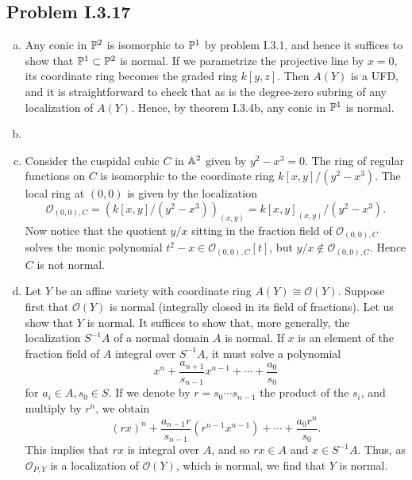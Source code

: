 \documentclass{mathnotes}
\begin{document}
\subsection*{Problem I.3.17}
\begin{enumerate}[(a)]
    \item Any conic in $\mathbb{P}^2$ is isomorphic to $\mathbb{P}^1$ by problem I.3.1, and hence it
        suffices to show that $\mathbb{P}^1\subset\mathbb{P}^2$ is normal. If we parametrize the
        projective line by $x=0$, its coordinate ring becomes the graded ring $k[y,z]$.
        Then $A(Y)$ is a UFD, and it is straightforward to check that as is the degree-zero
        subring of any localization of $A(Y)$. Hence, by theorem I.3.4b, any conic
        in $\mathbb{P}^1$ is normal.
    \item 
    \item Consider the cuspidal cubic $C$ in $\mathbb{A}^2$ given by $y^2-x^3=0$. The ring of regular
        functions on $C$ is isomorphic to the coordinate ring $k[x,y]/(y^2-x^3)$. The local
        ring at $(0,0)$ is given by the localization
        \[\mathcal{O}_{(0,0),C}=\left( k[x,y]/(y^2-x^3) \right)_{(x,y)}=k[x,y]_{(x,y)}/(y^2-x^3).\]
        Now notice that the quotient $y/x$ sitting in the fraction field of $\mathcal{O}_{(0,0),C}$
        solves the monic polynomial $t^2-x\in\mathcal{O}_{(0,0),C}[t]$, but $y/x\notin\mathcal{O}_{(0,0),C}$.
        Hence $C$ is not normal.
    \item Let $Y$ be an affine variety with coordinate ring $A(Y)\cong\mathcal{O}(Y)$. Suppose
        first that $\mathcal{O}(Y)$ is normal (integrally closed in its field of fractions).
        Let us show that $Y$ is normal. It suffices to show
        that, more generally, the localization $S^{-1}A$ of a normal domain $A$ is normal.
        If $x$ is an element of the fraction field of $A$ integral over $S^{-1}A$, it must solve
        a polynomial
        \[x^n+\frac{a_{n+1}}{s_{n-1}}x^{n-1}+\cdots+\frac{a_0}{s_0}\]
        for $a_i\in A,s_0\in S$. If we denote by $r=s_0\cdots s_{n-1}$ the product of the $s_i$,
        and multiply by $r^n$, we obtain
        \[(rx)^n+\frac{a_{n-1}r}{s_{n-1}}(r^{n-1}x^{n-1})+\cdots+\frac{a_0r^n}{s_0}.\]
        This implies that $rx$ is integral over $A$, and so $rx\in A$ and $x\in S^{-1}A$.
        Thus, as $\mathcal{O}_{P,Y}$ is a localization of $\mathcal{O}(Y)$,
        which is normal, we find that $Y$ is normal.


\end{enumerate}
\end{document}
